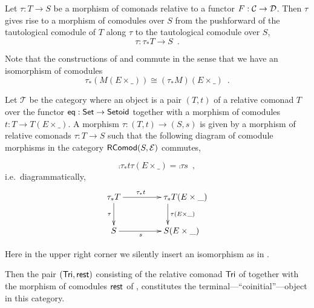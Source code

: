 \documentclass{amsart}
\begin{document}
\begin{definition}
  Let $\tau : T\to S$ be a morphism of comonads relative to a functor $F : {\mathcal{C}} \to \mathcal{D}$.
  Then $\tau$ gives rise to a morphism of comodules over $S$ from the pushforward of the tautological comodule
  of $T$ along $\tau$ to the tautological comodule over $S$,
  \[ \tau : \tau_*T \to S \enspace . \]
\end{definition}


\begin{remark}\label{rem:prod_pullback_commute}
 Note that the constructions of  and  commute in the sense that
 we have an isomorphism of comodules \[\tau_*(M(E\times \_)) \cong (\tau_*M)(E \times \_) \enspace . \]
\end{remark}



\begin{theorem}\label{ex:final_sem_tri}
   Let $\mathcal{T}$ be the category where an object is a pair $(T,t)$ of a relative comonad $T$ over the functor
   $\mathsf{eq}: \mathsf{Set} \to \mathsf{Setoid}$ together with a morphism of comodules $t : T \to T(E \times \_)$.
   A morphism $\tau : (T,t) \to (S,s)$ is given by a morphism of relative comonads $\tau : T \to S$ such that
   the following diagram of comodule morphisms in the category $\mathsf{RComod}(S,\mathcal{E})$ commutes,
   
   \[     \comp{\tau_*t}{\tau(E\times \_)} = \comp{\tau}{s} \enspace , \]
   i.e.\, diagrammatically,   
   \[ \begin{xy}
       \xymatrix{   \tau_*T  \ar[r]^{\tau_*t} \ar[d]_{\tau}  &  **[r] \tau_*T (E\times \_ )\ar[d]^{\tau(E\times \_)} \\
                    S  \ar[r]_{s}  &  **[r] S (E\times \_ )
        }
      \end{xy}
   \]

   \noindent
   Here in the upper right corner we silently insert an isomorphism as in .
   
   Then the pair $(\mathsf{Tri}, \mathsf{rest})$ consisting of the relative comonad $\mathsf{Tri}$ of  together with 
    the morphism of comodules $\mathsf{rest}$ of ,
   constitutes the terminal---\enquote{coinitial}---object in this category.
   
\end{theorem}
\end{document}
